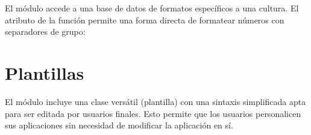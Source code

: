 \documentclass[a4,10pt,spanish]{sphinxmanual}
\begin{document}
\sphinxAtStartPar
El módulo  accede a una base de datos de formatos específicos a una cultura.  El atributo  de la función  permite una forma directa de formatear números con separadores de grupo:

\begin{sphinxVerbatim}[commandchars=\\\{\}]
 
 
            
  
  
 \PYG{p}{[}\PYG{p}{]}
                     \PYG{p}{[}\PYG{p}{]}  
\end{sphinxVerbatim}


\section{Plantillas}
\label{\detokenize{tutorial/stdlib2:templating}}\label{\detokenize{tutorial/stdlib2:tut-templating}}
\sphinxAtStartPar
El módulo  incluye una clase versátil  (plantilla) con una sintaxis simplificada apta para ser editada por usuarios finales.  Esto permite que los usuarios personalicen sus aplicaciones sin necesidad de modificar la aplicación en sí.
\end{document}
